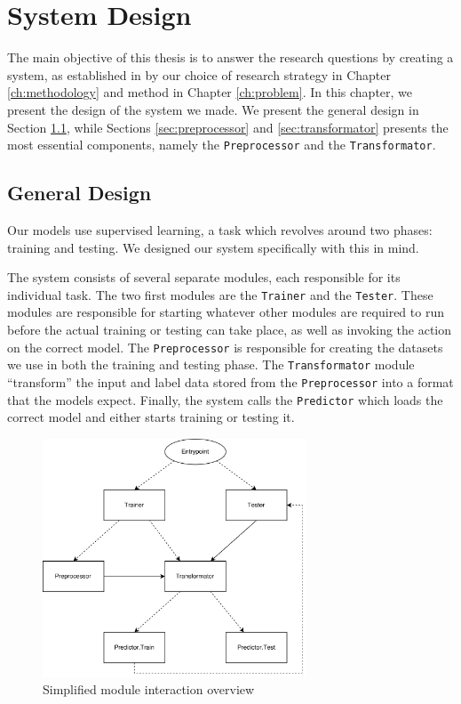 
\chapter{System Design}
\label{ch:system_design}
The main objective of this thesis is to answer the research questions by creating a system, as established in by our choice of research strategy in Chapter \ref{ch:methodology} and method in Chapter \ref{ch:problem}. In this chapter, we present the design of the system we made. We present the general design in Section \ref{sec:general_design}, while Sections \ref{sec:preprocessor} and \ref{sec:transformator} presents the most essential components, namely the {\tt Preprocessor} and the {\tt Transformator}.


\section{General Design}
\label{sec:general_design}
Our models use supervised learning, a task which revolves around two phases: training and testing. We designed our system specifically with this in mind.

The system consists of several separate modules, each responsible for its individual task. The two first modules are the {\tt Trainer} and the {\tt Tester}. These modules are responsible for starting whatever other modules are required to run before the actual training or testing can take place, as well as invoking the action on the correct model. The {\tt Preprocessor} is responsible for creating the datasets we use in both the training and testing phase. The {\tt Transformator} module ``transform'' the input and label data stored from the {\tt Preprocessor} into a format that the models expect. Finally, the system calls the {\tt Predictor} which loads the correct model and either starts training or testing it.

\newpage
\begin{figure}[ht]
    \centering
    \includegraphics[width=0.7\textwidth]{fig/system_design/system_design.png}
    \caption{Simplified module interaction overview}
    \label{fig:system-design}
\end{figure}

